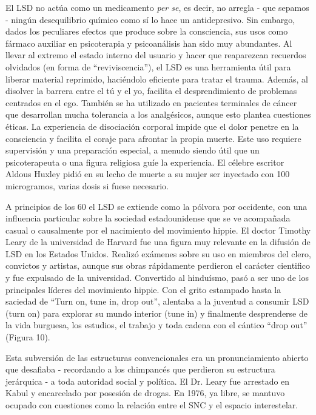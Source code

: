 El LSD no actúa como un medicamento \textit{per se}, es decir, no arregla - que sepamos - ningún desequilibrio químico como sí lo hace un antidepresivo. Sin embargo, dados los peculiares efectos que produce sobre la consciencia, sus usos como fármaco auxiliar en psicoterapia y psicoanálisis han sido muy abundantes. Al llevar al extremo el estado interno del usuario y hacer que reaparezcan recuerdos olvidados (en forma de \enquote{reviviscencia}), el LSD es una herramienta útil para liberar material reprimido, haciéndolo eficiente para tratar el trauma. Además, al disolver la barrera entre el tú y el yo, facilita el desprendimiento de problemas centrados en el ego. También se ha utilizado en pacientes terminales de cáncer que desarrollan mucha tolerancia a los analgésicos, aunque esto plantea cuestiones éticas. La experiencia de disociación corporal impide que el dolor penetre en la consciencia y facilita el coraje para afrontar la propia muerte. Este uso requiere supervisión y una preparación especial, a menudo siendo útil que un psicoterapeuta o una figura religiosa guíe la experiencia. El célebre escritor Aldous Huxley pidió en su lecho de muerte a su mujer ser inyectado con 100 microgramos, varias dosis si fuese necesario.

A principios de los 60 el LSD se extiende como la pólvora por occidente, con una influencia particular sobre la sociedad estadounidense que se ve acompañada casual o causalmente por el nacimiento del movimiento hippie. El doctor Timothy Leary de la universidad de Harvard fue una figura muy relevante en la difusión de LSD en los Estados Unidos. Realizó exámenes sobre su uso en miembros del clero, convictos y artistas, aunque sus obras rápidamente perdieron el carácter cientifico y fue expulsado de la universidad. Convertido al hinduísmo, pasó a ser uno de los principales líderes del movimiento hippie. Con el grito estampado hasta la saciedad de \enquote{Turn on, tune in, drop out}, alentaba a la juventud a consumir LSD (turn on) para explorar su mundo interior (tune in) y finalmente desprenderse de la vida burguesa, los estudios, el trabajo y toda cadena con el cántico \enquote{drop out} (Figura 10).


Esta subversión de las estructuras convencionales era un pronunciamiento abierto que desafiaba - recordando a los chimpancés que perdieron su estructura jerárquica - a toda autoridad social y política. El Dr. Leary fue arrestado en Kabul y encarcelado por posesión de drogas. En 1976, ya libre, se mantuvo ocupado con cuestiones como la relación entre el SNC y el espacio interestelar.

